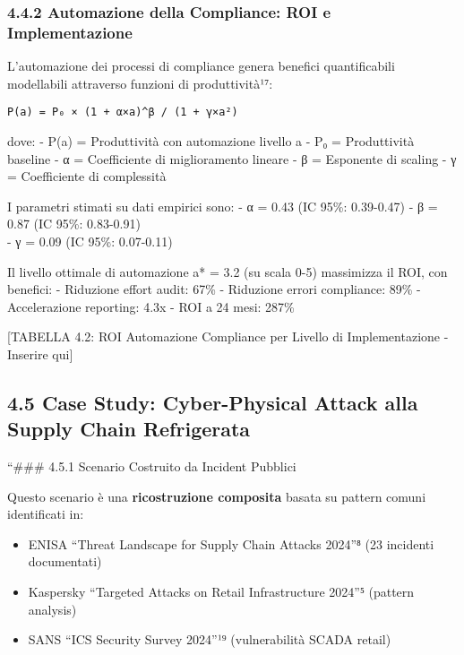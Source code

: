 \documentclass{report}
\begin{document}
\subsubsection{4.4.2 Automazione della Compliance: ROI e
Implementazione}\label{automazione-della-compliance-roi-e-implementazione}

L'automazione dei processi di compliance genera benefici quantificabili
modellabili attraverso funzioni di produttività¹⁷:

\begin{verbatim}
P(a) = P₀ × (1 + α×a)^β / (1 + γ×a²)
\end{verbatim}

dove: - P(a) = Produttività con automazione livello a - P₀ =
Produttività baseline - α = Coefficiente di miglioramento lineare - β =
Esponente di scaling - γ = Coefficiente di complessità

I parametri stimati su dati empirici sono: - α = 0.43 (IC 95\%:
0.39-0.47) - β = 0.87 (IC 95\%: 0.83-0.91)\\
- γ = 0.09 (IC 95\%: 0.07-0.11)

Il livello ottimale di automazione a* = 3.2 (su scala 0-5) massimizza il
ROI, con benefici: - Riduzione effort audit: 67\% - Riduzione errori
compliance: 89\% - Accelerazione reporting: 4.3x - ROI a 24 mesi: 287\%

{[}TABELLA 4.2: ROI Automazione Compliance per Livello di
Implementazione - Inserire qui{]}

\subsection{4.5 Case Study: Cyber-Physical Attack alla Supply Chain
Refrigerata}\label{case-study-cyber-physical-attack-alla-supply-chain-refrigerata}

``\#\#\# 4.5.1 Scenario Costruito da Incident Pubblici

Questo scenario è una \textbf{ricostruzione composita} basata su pattern
comuni identificati in:

\begin{itemize}
\tightlist
\item
  ENISA ``Threat Landscape for Supply Chain Attacks 2024''⁸ (23
  incidenti documentati)\\
\item
  Kaspersky ``Targeted Attacks on Retail Infrastructure 2024''⁵ (pattern
  analysis)\\
\item
  SANS ``ICS Security Survey 2024''¹⁹ (vulnerabilità SCADA retail)
\end{itemize}
\end{document}
